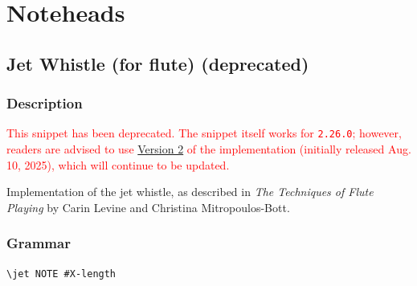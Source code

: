 \chapter {Noteheads}

\section {Jet Whistle (for flute) (deprecated)}
\label{sec:jet_whistle_1}
\hfill

\subsection{Description}

\textcolor{red}{
This snippet has been deprecated. The snippet itself works for \Verb|2.26.0|; however, readers are advised to use \hyperref[sec:jet_whistle_2]{Version 2} of the implementation (initially released Aug. 10, 2025), which will continue to be updated.
}


Implementation of the jet whistle, as described in \textit{The Techniques of Flute Playing} by Carin Levine and Christina Mitropoulos-Bott.\autocite[18]{RN1695} \par\hfill\par
\subsection{Grammar}
\begin{verbatim}
\jet NOTE #X-length
\end{verbatim}
